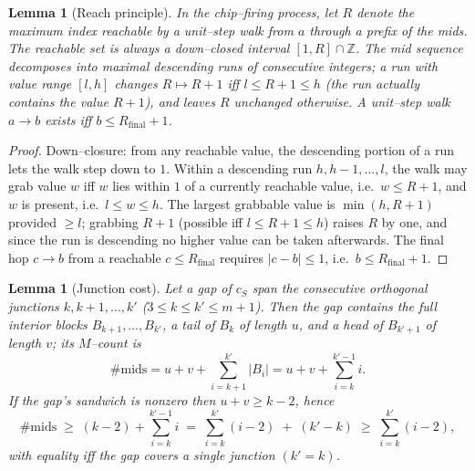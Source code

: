 \documentclass[11pt]{article}
\newtheorem{lemma}[theorem]{Lemma}
\theoremstyle{definition}
\begin{document}
\begin{lemma}[Reach principle]\label{lem:reach}
In the chip--firing process, let $R$ denote the maximum index reachable by a unit--step
walk from $a$ through a prefix of the mids. The reachable set is always a down--closed
interval $[1,R]\cap\mathbb Z$. The mid sequence decomposes into maximal descending runs
of consecutive integers; a run with value range $[l,h]$ changes $R\mapsto R+1$ iff
$l\le R+1\le h$ (the run actually \emph{contains} the value $R+1$), and leaves $R$
unchanged otherwise. A unit--step walk $a\to b$ exists iff $b\le R_{\mathrm{final}}+1$.
\end{lemma}

\begin{proof}
Down--closure: from any reachable value, the descending portion of a run lets the walk
step down to $1$. Within a descending run $h,h-1,\dots,l$, the walk may grab value $w$
iff $w$ lies within $1$ of a currently reachable value, i.e.\ $w\le R+1$, and $w$ is
present, i.e.\ $l\le w\le h$. The largest grabbable value is $\min(h,R+1)$ provided
$\ge l$; grabbing $R+1$ (possible iff $l\le R+1\le h$) raises $R$ by one, and since the
run is descending no higher value can be taken afterwards. The final hop $c\to b$ from
a reachable $c\le R_{\mathrm{final}}$ requires $|c-b|\le1$, i.e.\ $b\le R_{\mathrm{final}}+1$.
\end{proof}

\begin{lemma}[Junction cost]\label{lem:cost}
Let a gap of $c_S$ span the consecutive orthogonal junctions
$k,k+1,\dots,k'$ ($3\le k\le k'\le m+1$). Then the gap contains the full interior
blocks $B_{k+1},\dots,B_{k'}$, a tail of $B_k$ of length $u$, and a head of $B_{k'+1}$
of length $v$; its $M$--count is
\[
\#\text{mids}=u+v+\sum_{i=k+1}^{k'}|B_i|=u+v+\sum_{i=k}^{k'-1}i .
\]
If the gap's sandwich is nonzero then $u+v\ge k-2$, hence
\[
\#\text{mids}\;\ge\;(k-2)+\sum_{i=k}^{k'-1}i\;=\;\sum_{i=k}^{k'}(i-2)\;+\;(k'-k)
\;\ge\;\sum_{i=k}^{k'}(i-2),
\]
with equality iff the gap covers a single junction $(k'=k)$.
\end{lemma}
\end{document}
